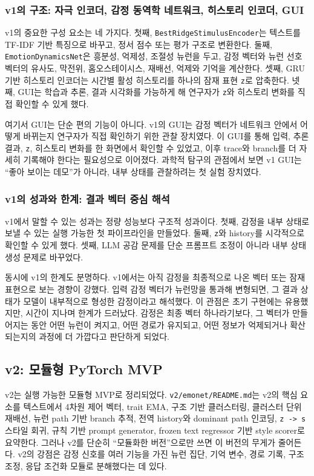\documentclass[11pt,a4paper]{article}
\newcommand{\eng}[1]{\texttt{#1}}
\begin{document}
\subsubsection{v1의 구조: 자극 인코더, 감정 동역학 네트워크, 히스토리 인코더, GUI}

v1의 중요한 구성 요소는 네 가지다. 첫째, \eng{BestRidgeStimulusEncoder}는 텍스트를 TF-IDF 기반 특징으로 바꾸고, 정서 점수 또는 평가 구조로 변환한다. 둘째, \eng{EmotionDynamicsNet}은 흥분성, 억제성, 조절성 뉴런을 두고, 감정 벡터와 뉴런 선호 벡터의 유사도, 막전위, 홈오스테이시스, 재배선, 억제와 기억을 계산한다. 셋째, GRU 기반 히스토리 인코더는 시간별 활성 히스토리를 하나의 잠재 표현 \eng{z}로 압축한다. 넷째, GUI는 학습과 추론, 결과 시각화를 가능하게 해 연구자가 \eng{z}와 히스토리 변화를 직접 확인할 수 있게 했다.

여기서 GUI는 단순 편의 기능이 아니다. v1의 GUI는 감정 벡터가 네트워크 안에서 어떻게 바뀌는지 연구자가 직접 확인하기 위한 관찰 장치였다. 이 GUI를 통해 입력, 추론 결과, \eng{z}, 히스토리 변화를 한 화면에서 확인할 수 있었고, 이후 trace와 branch를 더 자세히 기록해야 한다는 필요성으로 이어졌다. 과학적 탐구의 관점에서 보면 v1 GUI는 ``좋아 보이는 데모''가 아니라, 내부 상태를 관찰하려는 첫 실험 장치였다.

\subsubsection{v1의 성과와 한계: 결과 벡터 중심 해석}

v1에서 말할 수 있는 성과는 정량 성능보다 구조적 성과이다. 첫째, 감정을 내부 상태로 보낼 수 있는 실행 가능한 첫 파이프라인을 만들었다. 둘째, \eng{z}와 history를 시각적으로 확인할 수 있게 했다. 셋째, LLM 공감 문제를 단순 프롬프트 조정이 아니라 내부 상태 생성 문제로 바꾸었다.

동시에 v1의 한계도 분명하다. v1에서는 아직 감정을 최종적으로 나온 벡터 또는 잠재 표현으로 보는 경향이 강했다. 입력 감정 벡터가 뉴런망을 통과해 변형되면, 그 결과 상태가 모델이 내부적으로 형성한 감정이라고 해석했다. 이 관점은 초기 구현에는 유용했지만, 시간이 지나며 한계가 드러났다. 감정은 최종 벡터 하나라기보다, 그 벡터가 만들어지는 동안 어떤 뉴런이 켜지고, 어떤 경로가 유지되고, 어떤 정보가 억제되거나 확산되는지의 과정에 더 가깝다고 판단하게 되었다.

\subsection{v2: 모듈형 PyTorch MVP}

v2는 실행 가능한 모듈형 MVP로 정리되었다. \eng{v2/emonet/README.md}는 v2의 핵심 요소를 텍스트에서 4차원 제어 벡터, trait EMA, 구조 기반 클러스터링, 클러스터 단위 재배선, 뉴런 path 기반 branch 추적, 전역 history와 dominant path 인코딩, \eng{z -> s} 스타일 회귀, 규칙 기반 prompt generator, frozen text regressor 기반 style scorer로 요약한다. 그러나 v2를 단순히 ``모듈화한 버전''으로만 쓰면 이 버전의 무게가 줄어든다. v2의 강점은 감정 신호를 여러 기능을 가진 뉴런 집단, 기억 변수, 경로 기록, 구조 조정, 응답 조건화 모듈로 분해했다는 데 있다.
\end{document}

